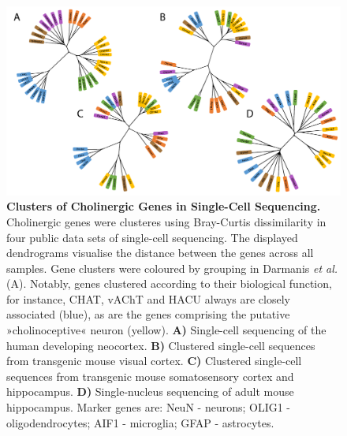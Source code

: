 \begin{figure}
\centering
\includegraphics[width=\textwidth]{figures/chol-clusters}
\caption[Clusters of Cholinergic Genes in Single-Cell Sequencing.]{\textbf{Clusters of Cholinergic Genes in Single-Cell Sequencing.} Cholinergic genes were clusteres using Bray-Curtis dissimilarity in four public data sets of single-cell sequencing. The displayed dendrograms visualise the distance between the genes across all samples. Gene clusters were coloured by grouping in Darmanis \emph{et al.}\cite{Darmanis2015} (A). Notably, genes clustered according to their biological function, for instance, CHAT, vAChT and HACU always are closely associated (blue), as are the genes comprising the putative »cholinoceptive« neuron (yellow). \textbf{A)} Single-cell sequencing of the human developing neocortex.\cite{Darmanis2015} \textbf{B)} Clustered single-cell sequences from transgenic mouse visual cortex.\cite{Tasic2016} \textbf{C)} Clustered single-cell sequences from transgenic mouse somatosensory cortex and hippocampus.\cite{Zeisel2015} \textbf{D)} Single-nucleus sequencing of adult mouse hippocampus.\cite{Habib2016} Marker genes are: NeuN - neurons; OLIG1 - oligodendrocytes; AIF1 - microglia; GFAP - astrocytes.
\label{fig:chol-clusters}}
\end{figure}